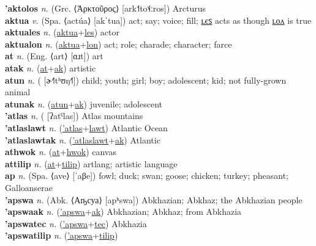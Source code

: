 \textbf{'aktolos} \textit{n.} (Grc. ⟨Ἀρκτοῦρος⟩ [ark˦to˦˨ːros])
Arcturus \label{'aktolos} \\
\textbf{aktua} \textit{v.} (Spa. ⟨actúa⟩ [akˈtua])
act; say; voice; fill; \hyperref[aktuales]{ʟєꜱ} acts as though \hyperref[aktualon]{ʟᴏᴧ} is true \label{aktua} \\
\textbf{aktuales} \textit{n.} (\hyperref[aktua]{aktua}+\hyperref[les]{les})
actor \label{aktuales} \\
\textbf{aktualon} \textit{n.} (\hyperref[aktua]{aktua}+\hyperref[lon]{lon})
act; role; charade; character; farce \label{aktualon} \\
\textbf{at} \textit{n.} (Eng. ⟨art⟩ [ɑɹt])
art \label{at} \\
\textbf{atak} \textit{n.} (\hyperref[at]{at}+\hyperref[ak]{ak})
artistic \label{atak} \\
\textbf{atun} \textit{n.} ( [ɚ˧˥tʰʊŋ˧˥])
child; youth; girl; boy; adolescent; kid; not fully-grown animal \label{atun} \\
\textbf{atunak} \textit{n.} (\hyperref[atun]{atun}+\hyperref[ak]{ak})
juvenile; adolescent \label{atunak} \\
\textbf{'atlas} \textit{n.} ( [ʔatˤlas])
Atlas mountains \label{'atlas} \\
\textbf{'atlaslawt} \textit{n.} (\hyperref['atlas]{'atlas}+\hyperref[lawt]{lawt})
Atlantic Ocean \label{'atlaslawt} \\
\textbf{'atlaslawtak} \textit{n.} (\hyperref['atlaslawt]{'atlaslawt}+\hyperref[ak]{ak})
Atlantic \label{'atlaslawtak} \\
\textbf{athwok} \textit{n.} (\hyperref[at]{at}+\hyperref[hwok]{hwok})
canvas \label{athwok} \\
\textbf{attilip} \textit{n.} (\hyperref[at]{at}+\hyperref[tilip]{tilip})
artlang; artistic language \label{attilip} \\
\textbf{ap} \textit{n.} (Spa. ⟨ave⟩ [ˈaβe])
fowl; duck; swan; goose; chicken; turkey; pheasant; Galloanserae \label{ap} \\
\textbf{'apswa} \textit{n.} (Abk. ⟨Аҧсуа⟩ [apʰswa])
Abkhazian; Abkhaz; the Abkhazian people \label{'apswa} \\
\textbf{'apswaak} \textit{n.} (\hyperref['apswa]{'apswa}+\hyperref[ak]{ak})
Abkhazian; Abkhaz; from Abkhazia \label{'apswaak} \\
\textbf{'apswatec} \textit{n.} (\hyperref['apswa]{'apswa}+\hyperref[tec]{tec})
Abkhazia \label{'apswatec} \\
\textbf{'apswatilip} \textit{n.} (\hyperref['apswa]{'apswa}+\hyperref[tilip]{tilip})

